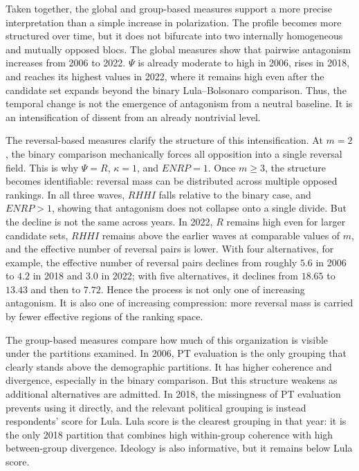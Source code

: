 \documentclass[12pt]{article}
\begin{document}
Taken together, the global and group-based measures support a more precise
interpretation than a simple increase in polarization. The profile becomes
more structured over time, but it does not bifurcate into two internally
homogeneous and mutually opposed blocs. The global measures show that pairwise
antagonism increases from 2006 to 2022. \(\Psi\) is already moderate to high
in 2006, rises in 2018, and reaches its highest values in 2022, where it
remains high even after the candidate set expands beyond the binary
Lula--Bolsonaro comparison. Thus, the temporal change is not the emergence of
antagonism from a neutral baseline. It is an intensification of dissent from
an already nontrivial level.

The reversal-based measures clarify the structure of this intensification.
At \(m=2\), the binary comparison mechanically forces all opposition into a
single reversal field. This is why \(\Psi=R\), \(\kappa=1\), and
\(ENRP=1\). Once \(m\geq 3\), the structure becomes identifiable: reversal
mass can be distributed across multiple opposed rankings. In all three waves,
\(RHHI\) falls relative to the binary case, and \(ENRP>1\), showing that
antagonism does not collapse onto a single divide. But the decline is not the
same across years. In 2022, \(R\) remains high even for larger candidate sets,
\(RHHI\) remains above the earlier waves at comparable values of \(m\), and
the effective number of reversal pairs is lower. With four alternatives, for
example, the effective number of reversal pairs declines from roughly \(5.6\)
in 2006 to \(4.2\) in 2018 and \(3.0\) in 2022; with five alternatives, it
declines from \(18.65\) to \(13.43\) and then to \(7.72\). Hence the process
is not only one of increasing antagonism. It is also one of increasing
compression: more reversal mass is carried by fewer effective regions of the
ranking space.

The group-based measures compare how much of this organization is visible under
the partitions examined. In 2006, PT evaluation is the only grouping that
clearly stands above the demographic partitions. It has higher coherence and
divergence, especially in the binary comparison. But this structure weakens as
additional alternatives are admitted. In 2018, the missingness of PT evaluation
prevents using it directly, and the relevant political grouping is instead
respondents' score for Lula. Lula score is the clearest grouping in that year:
it is the only 2018 partition that combines high within-group coherence with
high between-group divergence. Ideology is also informative, but it remains
below Lula score.
\end{document}
